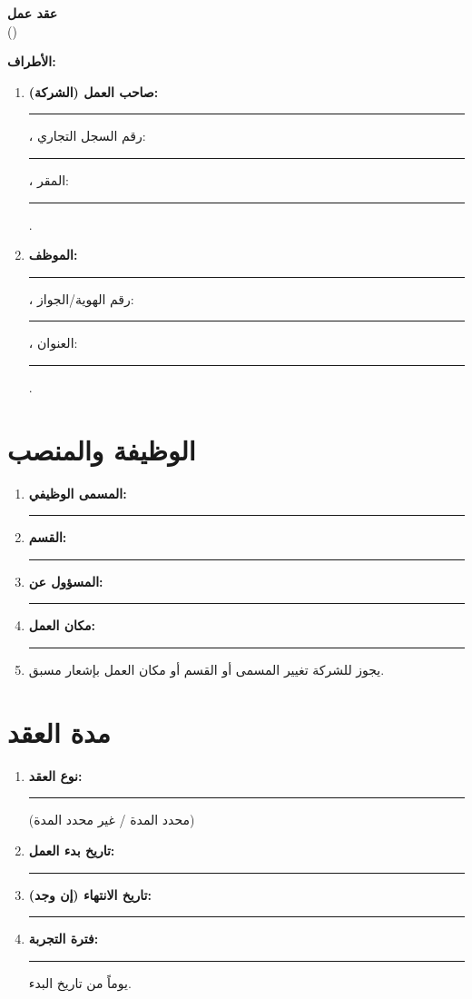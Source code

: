\documentclass[12pt,a4paper]{article}
\begin{document}
\begin{center}
{\LARGE\bfseries عقد عمل}\\[0.5em]
{\large ()}\\[1em]
\end{center}

\vspace{1em}

\noindent\textbf{الأطراف:}

\begin{enumerate}
    \item \textbf{صاحب العمل (الشركة):} \rule{8cm}{0.4pt}، رقم السجل التجاري: \rule{4cm}{0.4pt}، المقر: \rule{6cm}{0.4pt}.

    \item \textbf{الموظف:} \rule{8cm}{0.4pt}، رقم الهوية/الجواز: \rule{4cm}{0.4pt}، العنوان: \rule{6cm}{0.4pt}.
\end{enumerate}

\vspace{1em}

\section{الوظيفة والمنصب}
\label{sec:position}
\begin{enumerate}
    \item \textbf{المسمى الوظيفي:} \rule{6cm}{0.4pt}
    \item \textbf{القسم:} \rule{6cm}{0.4pt}
    \item \textbf{المسؤول عن:} \rule{6cm}{0.4pt}
    \item \textbf{مكان العمل:} \rule{6cm}{0.4pt}
    \item يجوز للشركة تغيير المسمى أو القسم أو مكان العمل بإشعار مسبق.
\end{enumerate}

\section{مدة العقد}
\label{sec:duration}
\begin{enumerate}
    \item \textbf{نوع العقد:} \rule{4cm}{0.4pt} (محدد المدة / غير محدد المدة)
    \item \textbf{تاريخ بدء العمل:} \rule{4cm}{0.4pt}
    \item \textbf{تاريخ الانتهاء (إن وجد):} \rule{4cm}{0.4pt}
    \item \textbf{فترة التجربة:} \rule{2cm}{0.4pt} يوماً من تاريخ البدء.
\end{enumerate}
\end{document}
